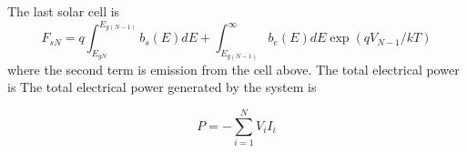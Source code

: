 \documentclass[12pt]{article}
\begin{document}
The last solar cell is 
\begin{equation}
F_{sN} = q \int_{E_{gN}}^{E_{g(N-1)}} b_s(E) dE + \int_{E_{g(N-1)}}^{\infty} b_e(E) dE \exp (q V_{N-1}/ k T)
\end{equation}
where the second term is emission from the cell above.  
The total electrical power is 
The total electrical power generated by the system is 

\begin{equation}
P = - \sum_{i = 1}^{N} V_i I_i
\end{equation}

%
%
%
%
%
\end{document}
